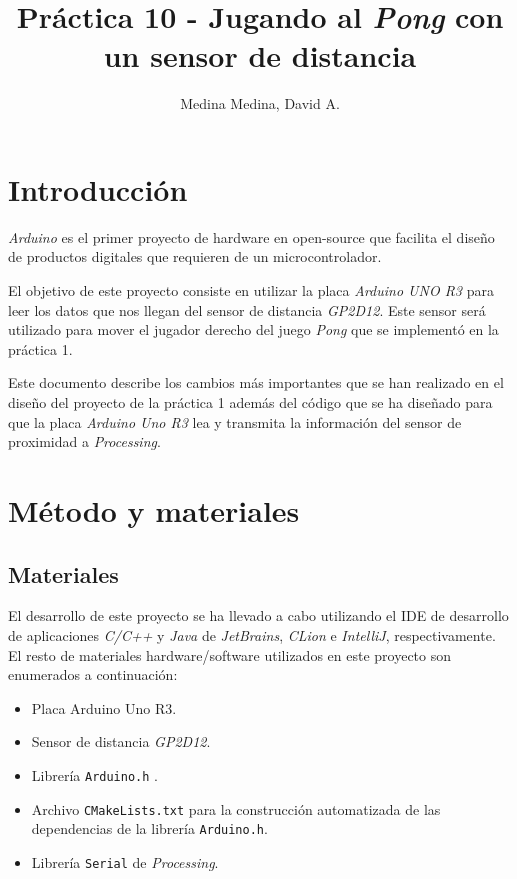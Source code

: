 \documentclass[10pt,a4paper]{report}
\author{Medina Medina, David A.\\}
\title{Práctica 10 - Jugando al \textit{Pong} con un sensor de distancia}
\begin{document}
	\maketitle
	\tableofcontents
	
	\chapter{Introducción}
	\textit{Arduino} es el primer proyecto de hardware en open-source que facilita el diseño de productos digitales que requieren de un microcontrolador.
	
	El objetivo de este proyecto \cite{repositorio-github} consiste en utilizar la placa \textit{Arduino UNO R3} para leer los datos que nos llegan del sensor de distancia \textit{GP2D12}. Este sensor será utilizado para mover el jugador derecho del juego \textit{Pong} que se implementó en la práctica 1.
	
	Este documento describe los cambios más importantes que se han realizado en el diseño del proyecto de la práctica 1 además del código que se ha diseñado para que la placa \textit{Arduino Uno R3} lea y transmita la información del sensor de proximidad a \textit{Processing}.
	
	
	\chapter{Método y materiales}
	\section{Materiales}
	El desarrollo de este proyecto se ha llevado a cabo utilizando el IDE de desarrollo de aplicaciones \textit{C/C++} y \textit{Java} de \textit{JetBrains}, \textit{CLion} e \textit{IntelliJ}, respectivamente. El resto de materiales hardware/software utilizados en este proyecto son enumerados a continuación:
	\begin{itemize}
		\item Placa Arduino Uno R3.
		\item Sensor de distancia \textit{GP2D12}.
		\item Librería \texttt{Arduino.h} \cite{arduino-reference}.
		\item Archivo \texttt{CMakeLists.txt} para la construcción automatizada de las dependencias de la librería \texttt{Arduino.h}.
		\item Librería \texttt{Serial} de \textit{Processing}.
	\end{itemize}
\end{document}

